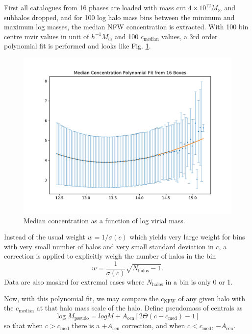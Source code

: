 \documentclass[fleqn,usenatbib]{mnras}
\begin{document}
			First all catalogues from 16 phases are loaded with mass cut $4\times 10^{12} M_\odot$ and subhalos dropped, and for 100 log halo mass bins between the minimum and maximum log masses, the median NFW concentration is extracted. With 100 bin centre mvir values in unit of $h^{-1} M_\odot$ and 100 $c_\text{median}$ values, a 3rd order polynomial fit is performed and looks like Fig. \ref{fig:c_median_poly}.
			
			\begin{figure}
				\includegraphics[width=\linewidth]{c_median_poly.pdf}
			    \caption{Median concentration as a function of log virial mass.}
			    \label{fig:c_median_poly}
			\end{figure}
			
			Instead of the usual weight $ w = 1/\sigma(c)$ which yields very large weight for bins with very small number of halos and very small standard deviation in $c$, a correction is applied to explicitly weigh the number of halos in the bin
			\begin{equation}
				w = \frac{1}{\sigma(c)}  \sqrt{N_\text{halos} - 1}.
			\end{equation}
			Data are also masked for extremal cases where $N_\text{halos}$ in a bin is only 0 or 1.
			
			Now, with this polynomial fit, we may compare the $c_\text{NFW}$ of any given halo with the $c_\text{median}$ at that halo mass scale of the halo. Define pseudomass of centrals as
			\begin{equation}
				\log M_\text{pseudo} = log M + A_\text{cen} \left[ 2 \Theta(c-c_\text{med}) - 1 \right]
			\end{equation}
			so that when $c > c_\text{med}$ there is a $+A_\text{cen}$ correction, and when $c < c_\text{med}$, $-A_\text{cen}$.
			
\end{document}
